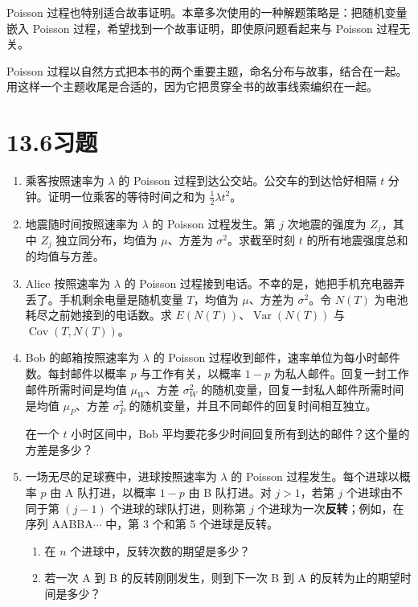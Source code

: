 \documentclass[UTF8,12pt,a4paper,fontset=fandol]{ctexart}
\begin{document}
Poisson 过程也特别适合故事证明。本章多次使用的一种解题策略是：把随机变量嵌入 Poisson 过程，希望找到一个故事证明，即使原问题看起来与 Poisson 过程无关。

Poisson 过程以自然方式把本书的两个重要主题，命名分布与故事，结合在一起。用这样一个主题收尾是合适的，因为它把贯穿全书的故事线索编织在一起。

\section*{13.6\quad 习题}

\begin{enumerate}
  \item 乘客按照速率为 $\lambda$ 的 Poisson 过程到达公交站。公交车的到达恰好相隔 $t$ 分钟。证明一位乘客的等待时间之和为 $\frac12\lambda t^2$。

  \item 地震随时间按照速率为 $\lambda$ 的 Poisson 过程发生。第 $j$ 次地震的强度为 $Z_j$，其中 $Z_j$ 独立同分布，均值为 $\mu$、方差为 $\sigma^2$。求截至时刻 $t$ 的所有地震强度总和的均值与方差。

  \item Alice 按照速率为 $\lambda$ 的 Poisson 过程接到电话。不幸的是，她把手机充电器弄丢了。手机剩余电量是随机变量 $T$，均值为 $\mu$、方差为 $\sigma^2$。令 $N(T)$ 为电池耗尽之前她接到的电话数。求 $E(N(T))$、$\operatorname{Var}(N(T))$ 与 $\operatorname{Cov}(T,N(T))$。

  \item Bob 的邮箱按照速率为 $\lambda$ 的 Poisson 过程收到邮件，速率单位为每小时邮件数。每封邮件以概率 $p$ 与工作有关，以概率 $1-p$ 为私人邮件。回复一封工作邮件所需时间是均值 $\mu_W$、方差 $\sigma_W^2$ 的随机变量，回复一封私人邮件所需时间是均值 $\mu_P$、方差 $\sigma_P^2$ 的随机变量，并且不同邮件的回复时间相互独立。

  在一个 $t$ 小时区间中，Bob 平均要花多少时间回复所有到达的邮件？这个量的方差是多少？

  \item 一场无尽的足球赛中，进球按照速率为 $\lambda$ 的 Poisson 过程发生。每个进球以概率 $p$ 由 A 队打进，以概率 $1-p$ 由 B 队打进。对 $j>1$，若第 $j$ 个进球由不同于第 $(j-1)$ 个进球的球队打进，则称第 $j$ 个进球为一次\textbf{反转}；例如，在序列 AABBA$\cdots$ 中，第 3 个和第 5 个进球是反转。
  \begin{enumerate}
    \item 在 $n$ 个进球中，反转次数的期望是多少？
    \item 若一次 A 到 B 的反转刚刚发生，则到下一次 B 到 A 的反转为止的期望时间是多少？
  \end{enumerate}


\end{enumerate}
\end{document}
